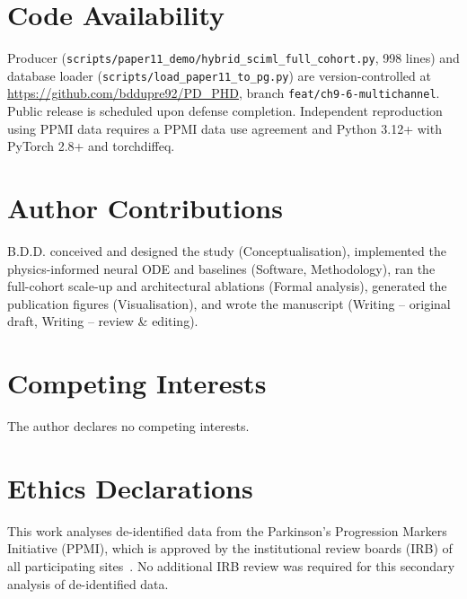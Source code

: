 \section*{Code Availability}

Producer (\texttt{scripts/paper11\_demo/hybrid\_sciml\_full\_cohort.py}, 998 lines) and database loader (\texttt{scripts/load\_paper11\_to\_pg.py}) are version-controlled at \url{https://github.com/bddupre92/PD\_PHD}, branch \texttt{feat/ch9-6-multichannel}. Public release is scheduled upon defense completion. Independent reproduction using PPMI data requires a PPMI data use agreement and Python 3.12+ with PyTorch 2.8+ and torchdiffeq.

\section*{Author Contributions}

B.D.D. conceived and designed the study (Conceptualisation), implemented the physics-informed neural ODE and baselines (Software, Methodology), ran the full-cohort scale-up and architectural ablations (Formal analysis), generated the publication figures (Visualisation), and wrote the manuscript (Writing -- original draft, Writing -- review \& editing).

\section*{Competing Interests}

The author declares no competing interests.

\section*{Ethics Declarations}

This work analyses de-identified data from the Parkinson's Progression Markers Initiative (PPMI), which is approved by the institutional review boards (IRB) of all participating sites~\cite{marek2018ppmi}. No additional IRB review was required for this secondary analysis of de-identified data.
